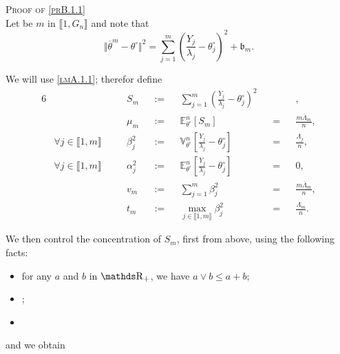 \begin{pro}{\textsc{Proof of \textsc{\cref{prB.1.1}}} \\}\label{proB.1.1}
Let be $m$ in $\llbracket 1, G_{n} \rrbracket$ and note that
\[\Vert \overline{\theta}^{m} - \theta^{\circ} \Vert^{2} = \sum\limits_{j = 1}^{m} \left(\frac{Y_{j}}{\lambda_{j}} - \theta^{\circ}_{j}\right)^{2} + \mathfrak{b}_{m}.\]

We will use \textsc{\cref{lmA.1.1}}; therefor define 
\begin{alignat*}{6}
& &&S_{m} &&:=&& \sum\limits_{j = 1}^{m} \left(\frac{Y_{j}}{\lambda_{j}} - \theta^{\circ}_{j}\right)^{2}&& &&,\\
& &&\mu_{m}&&:=&&\mathds{E}_{\theta^{\circ}}^{n}\left[S_{m}\right] &&=&& \frac{m \overline{\Lambda}_{m}}{n},\\
& \forall j \in \llbracket 1, m \rrbracket \quad && \beta_{j}^{2} &&:=&& \mathds{V}_{\theta^{\circ}}^{n}\left[\frac{Y_{j}}{\lambda_{j}} - \theta^{\circ}_{j}\right] &&=&& \frac{\Lambda_{j}}{n},\\
& \forall j \in \llbracket 1, m \rrbracket \quad && \alpha_{j}^{2} &&:=&& \mathds{E}_{\theta^{\circ}}^{n}\left[\frac{Y_{j}}{\lambda_{j}} - \theta^{\circ}_{j}\right] &&=&& 0,\\
& && v_{m} &&:=&& \sum\limits_{j = 1}^{m}\beta_{j}^{2} &&=&& \frac{m \overline{\Lambda}_{m}}{n},\\
& && t_{m} &&:=&& \max\limits_{j \in \llbracket 1, m \rrbracket}\beta_{j}^{2} &&=&& \frac{\Lambda_{m}}{n}.
\end{alignat*}

We then control the concentration of $S_{m}$, first from above, using the following facts:

\begin{itemize}
\item for any $a$ and $b$ in $\R_{+}$, we have $a \vee b \leq a+b$;
\item {};
\item {}
\end{itemize}

and we obtain


\end{pro}
